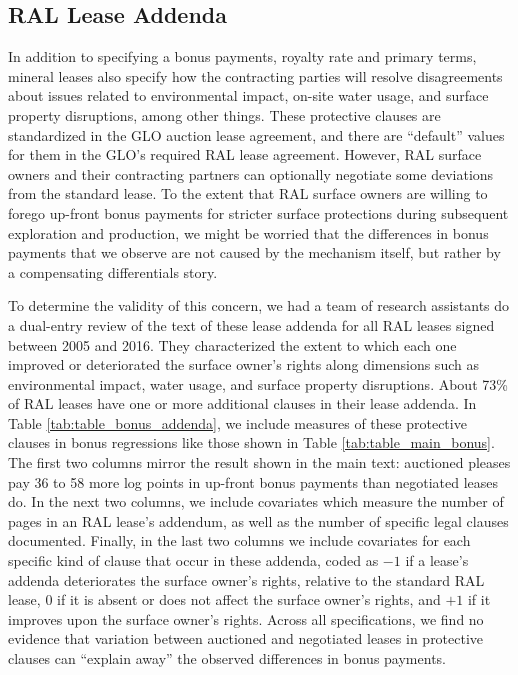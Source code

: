 \documentclass[12pt]{article}
\begin{document}
\begin{appendices}
\section{RAL Lease Addenda}\label{sec:Appendix_Addenda}
In addition to specifying a bonus payments, royalty rate and primary terms, mineral leases also specify how the contracting parties will resolve disagreements about issues related to environmental impact, on-site water usage, and surface property disruptions, among other things.  These protective clauses are standardized in the GLO auction lease agreement, and there are ``default'' values for them in the GLO's required RAL lease agreement.  However, RAL surface owners and their contracting partners can optionally negotiate some deviations from the standard lease.  To the extent that RAL surface owners are willing to forego up-front bonus payments for stricter surface protections during subsequent exploration and production, we might be worried that the differences in bonus payments that we observe are not caused by the mechanism itself, but rather by a compensating differentials story.

To determine the validity of this concern, we had a team of research assistants do a dual-entry review of the text of these lease addenda for all RAL leases signed between 2005 and 2016.  They characterized the extent to which each one improved or deteriorated the surface owner's rights along dimensions such as environmental impact, water usage, and surface property disruptions.  About 73\% of RAL leases have one or more additional clauses in their lease addenda.  In Table \ref{tab:table_bonus_addenda}, we include measures of these protective clauses in bonus regressions like those shown in Table \ref{tab:table_main_bonus}.  The first two columns mirror the result shown in the main text: auctioned pleases pay 36 to 58 more log points in up-front bonus payments than negotiated leases do.  In the next two columns, we include covariates which measure the number of pages in an RAL lease's addendum, as well as the number of specific legal clauses documented.  Finally, in the last two columns we include covariates for each specific kind of clause that occur in these addenda, coded as $-1$ if a lease's addenda deteriorates the surface owner's rights, relative to the standard RAL lease, $0$ if it is absent or does not affect the surface owner's rights, and $+1$ if it improves upon the surface owner's rights.  Across all specifications, we find no evidence that variation between auctioned and negotiated leases in protective clauses can ``explain away'' the observed differences in bonus payments. 


\end{appendices}
\end{document}
